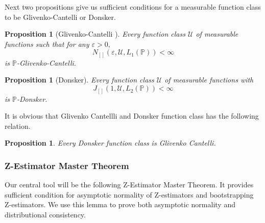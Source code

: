 \documentclass{article}
\numberwithin{equation}{section}
\theoremstyle{plain}
\newtheorem{proposition}[theorem]{Proposition}
\theoremstyle{definition}
\theoremstyle{remark}
\begin{document}
Next two propositions give us sufficient conditions for a measurable function class to be Glivenko-Cantelli or Donsker.

\begin{proposition}[Glivenko-Cantelli \citep{empirical_process}] \label{GC_thm}
    Every function class $\mathcal{U}$ of measurable functions such that for any $\varepsilon > 0,$ 
    $$N_{[]}(\varepsilon,\mathcal{U},L_1(\mathbb{P})) < \infty$$ 
    is $\mathbb{P}$-Glivenko-Cantelli. 
\end{proposition}

\begin{proposition}[Donsker\citep{empirical_process}] \label{Donsker_thm}
    Every function class $\mathcal{U}$ of measurable functions with
    $$
    J_{[]}\left(1,\mathcal{U},L_2(\mathbb{P})\right) < \infty
    $$
    is $\mathbb{P}$-Donsker.
\end{proposition}

It is obvious that Glivenko Cantellli and Donsker function class has the following relation.

\begin{proposition}\label{GC_and_Donsker}
    Every Donsker function class is Glivenko Cantelli.
\end{proposition}

\subsubsection{Z-Estimator Master Theorem}
Our central tool will be the following Z-Estimator Master Theorem. It provides sufficient condition for asymptotic normality of Z-estimators and bootstrapping Z-estimators. We use this lemma to prove both asymptotic normality and distributional consistency.
\end{document}
